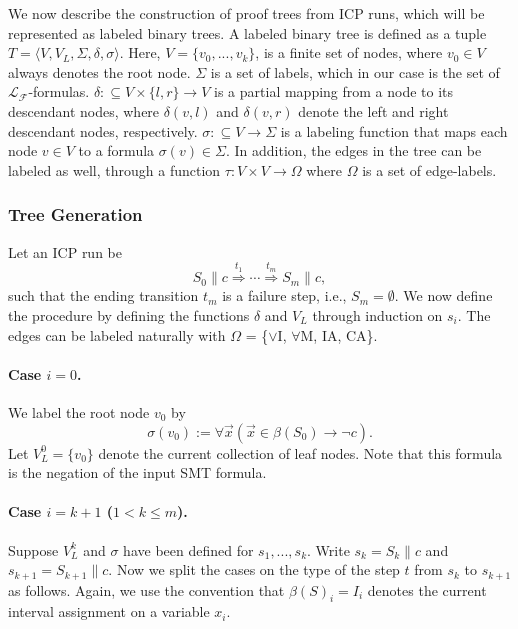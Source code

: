 \documentclass{llncs}
\begin{document}
We now describe the construction of proof trees from ICP runs, which will be
represented as labeled binary trees. A labeled binary tree is defined as a
tuple $T =
\langle V, V_L,  \Sigma, \delta, \sigma\rangle$. Here, $V = \{v_0, ..., v_k\}$, is a finite set of nodes, where $v_0\in V$ always denotes the
root
node. $\Sigma$ is a set of labels, which in our case is the set of
$\mathcal{L}_\mathcal{F}$-formulas. $\delta:\subseteq V\times \{l,r\}
\rightarrow V$ is a
partial mapping from a node to its descendant nodes, where $\delta(v, l)$ and
$\delta(v, r)$ denote the left and right descendant nodes, respectively.
$\sigma:\subseteq V\rightarrow \Sigma$ is a labeling function that maps each node
$v\in V$ to a formula $\sigma(v) \in \Sigma$. In addition, the edges in the
tree can be labeled as well, through a function $\tau: V\times V\rightarrow \Omega$
where $\Omega$ is a set of edge-labels.

\subsubsection{Tree Generation} Let an ICP run be
$$S_0\parallel c\stackrel{t_1}{\Longrightarrow}\cdots
\stackrel{t_m}{\Longrightarrow} S_m\parallel c,$$
such that the ending transition $t_m$ is a failure step, i.e., $S_m=\emptyset$.
We now define the procedure by defining the functions $\delta$ and
$V_L$ through induction on $s_i$. The edges can be labeled naturally with
$\Omega$ = \{{$\vee$I}, $\forall$M, IA, CA\}.

\paragraph{Case $i= 0$.} We label the root node $v_0$ by
$$\sigma(v_0) := \forall \vec x( \vec x\in \beta(S_0) \rightarrow \neg c).$$
Let $V_L^0= \{v_0\}$ denote the current
collection of leaf nodes. Note that this formula is the negation of the input
SMT formula.




\paragraph{Case $i = k+1$ ($1< k \leq m$). }
Suppose $V_L^k$ and $\sigma$ have been defined for $s_1, ...,s_k$. Write
$s_k = S_k
\parallel c$ and $s_{k+1} = S_{k+1} \parallel c$. Now we split
the cases on the type of the step $t$ from $s_k$ to $s_{k+1}$ as follows.
Again, we use the convention that $\beta(S)_i = I_i$ denotes the current
interval assignment on a variable $x_i$.
\end{document}
